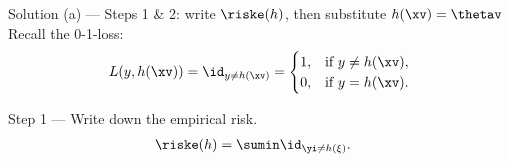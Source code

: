 \documentclass[aspectratio=169]{beamer}
\begin{document}
\begin{frame}{Solution (a) --- Steps 1 \& 2: write $\riske(h)$, then substitute $h(\xv) = \thetav$}
\small
Recall the 0-1-loss:
$$L(y, h(\xv)) = \id_{y \neq h(\xv)} = \begin{cases}
	1, & \text{if } y \neq h(\xv), \\
	0, & \text{if } y = h(\xv).
\end{cases}$$

Step 1 --- Write down the empirical risk.
\vspace{-6pt}
\begin{align*}
	\riske(h) &= \sumin \id_{\yi \neq h(\xi)}.
\end{align*}


\end{frame}
\end{document}
